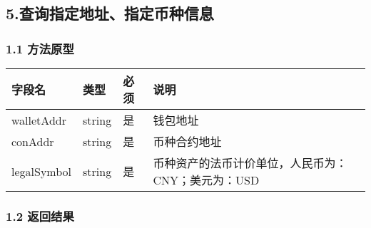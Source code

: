\documentclass[letterpaper,10pt,english]{sphinxmanual}
\begin{document}
\subsection{5.查询指定地址、指定币种信息}
\label{\detokenize{BCBWalletSDK_u63a5_u53e3_u8bf4_u660e:id72}}

\subsubsection{1.1 方法原型}
\label{\detokenize{BCBWalletSDK_u63a5_u53e3_u8bf4_u660e:id73}}



\begin{savenotes}\sphinxattablestart
\centering
\begin{tabulary}{\linewidth}[t]{|T|T|T|T|}
\hline
\sphinxstyletheadfamily 
字段名
&\sphinxstyletheadfamily 
类型
&\sphinxstyletheadfamily 
必须
&\sphinxstyletheadfamily 
说明
\\
\hline
walletAddr
&
string
&
是
&
钱包地址
\\
\hline
conAddr
&
string
&
是
&
币种合约地址
\\
\hline
legalSymbol
&
string
&
是
&
币种资产的法币计价单位，人民币为：CNY；美元为：USD
\\
\hline
\end{tabulary}
\par
\sphinxattableend\end{savenotes}


\subsubsection{1.2 返回结果}
\label{\detokenize{BCBWalletSDK_u63a5_u53e3_u8bf4_u660e:id74}}
\end{document}
